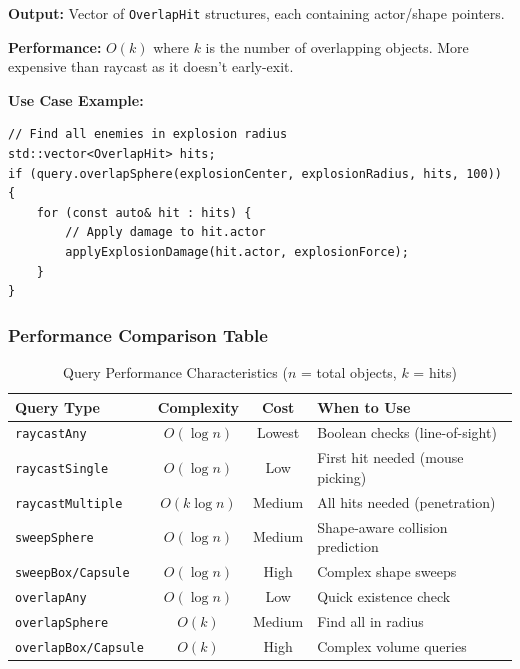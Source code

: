 \textbf{Output:} Vector of \texttt{OverlapHit} structures, each containing actor/shape pointers.

\textbf{Performance:} $O(k)$ where $k$ is the number of overlapping objects. More expensive than raycast as it doesn't early-exit.

\textbf{Use Case Example:}
\begin{lstlisting}[style=cpp]
// Find all enemies in explosion radius
std::vector<OverlapHit> hits;
if (query.overlapSphere(explosionCenter, explosionRadius, hits, 100)) {
    for (const auto& hit : hits) {
        // Apply damage to hit.actor
        applyExplosionDamage(hit.actor, explosionForce);
    }
}
\end{lstlisting}

\subsubsection{Performance Comparison Table}

\begin{table}[h]
\centering
\begin{tabular}{|l|c|c|p{4cm}|}
\hline
\textbf{Query Type} & \textbf{Complexity} & \textbf{Cost} & \textbf{When to Use} \\
\hline
\texttt{raycastAny} & $O(\log n)$ & Lowest & Boolean checks (line-of-sight) \\
\hline
\texttt{raycastSingle} & $O(\log n)$ & Low & First hit needed (mouse picking) \\
\hline
\texttt{raycastMultiple} & $O(k \log n)$ & Medium & All hits needed (penetration) \\
\hline
\texttt{sweepSphere} & $O(\log n)$ & Medium & Shape-aware collision prediction \\
\hline
\texttt{sweepBox/Capsule} & $O(\log n)$ & High & Complex shape sweeps \\
\hline
\texttt{overlapAny} & $O(\log n)$ & Low & Quick existence check \\
\hline
\texttt{overlapSphere} & $O(k)$ & Medium & Find all in radius \\
\hline
\texttt{overlapBox/Capsule} & $O(k)$ & High & Complex volume queries \\
\hline
\end{tabular}
\caption{Query Performance Characteristics ($n$ = total objects, $k$ = hits)}
\end{table}


